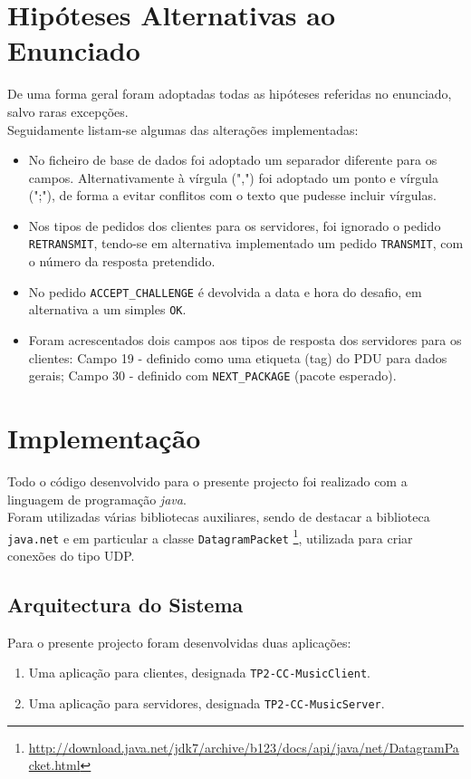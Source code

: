 \documentclass{llncs}
\begin{document}
\section{Hipóteses Alternativas ao Enunciado}
De uma forma geral foram adoptadas todas as hipóteses referidas no enunciado, 
salvo raras excepções.\\

Seguidamente listam-se algumas das alterações implementadas:
\begin{itemize}
\item No ficheiro de base de dados foi adoptado um separador diferente para os campos. 
		Alternativamente à vírgula (",") foi adoptado um ponto e vírgula (";"), de forma a 
		evitar conflitos com o texto que pudesse incluir vírgulas.
\item Nos tipos de pedidos dos clientes para os servidores, foi ignorado o pedido 
		\verb!RETRANSMIT!, tendo-se em alternativa implementado um pedido \verb!TRANSMIT!, 
		com o número da resposta pretendido.
\item No pedido \verb!ACCEPT_CHALLENGE! é devolvida a data e hora do desafio, em alternativa 
		a um simples \verb!OK!.
\item Foram acrescentados dois campos aos tipos de resposta dos servidores para os clientes: 
		Campo 19 - definido como uma etiqueta (tag) do PDU para dados gerais;
		Campo 30 - definido com \verb!NEXT_PACKAGE! (pacote esperado).
\end{itemize}

\section{Implementação}
Todo o código desenvolvido para o presente projecto foi realizado com a linguagem de 
programação \emph{java}.\\

Foram utilizadas várias bibliotecas auxiliares, sendo de destacar a biblioteca 
\verb!java.net! e em particular a classe \verb!DatagramPacket! 
\footnote{\url{http://download.java.net/jdk7/archive/b123/docs/api/java/net/DatagramPacket.html}}, 
utilizada para criar conexões do tipo UDP.

\subsection{Arquitectura do Sistema}
Para o presente projecto foram desenvolvidas duas aplicações:
\begin{enumerate}
\item Uma aplicação para clientes, designada \verb!TP2-CC-MusicClient!.
\item Uma aplicação para servidores, designada \verb!TP2-CC-MusicServer!.
\end{enumerate}
\end{document}
